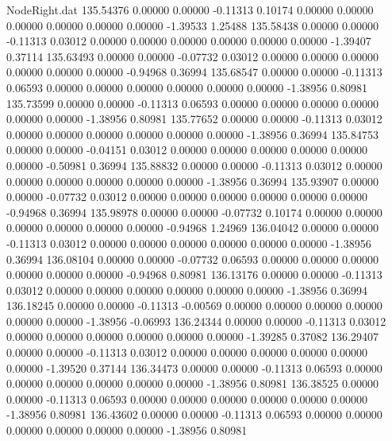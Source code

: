 \begin{filecontents}{NodeRight.dat}
 135.54376    0.00000    0.00000    -0.11313    0.10174    0.00000    0.00000    0.00000    0.00000    0.00000    0.00000   -1.39533    1.25488
 135.58438    0.00000    0.00000    -0.11313    0.03012    0.00000    0.00000    0.00000    0.00000    0.00000    0.00000   -1.39407    0.37114
 135.63493    0.00000    0.00000    -0.07732    0.03012    0.00000    0.00000    0.00000    0.00000    0.00000    0.00000   -0.94968    0.36994
 135.68547    0.00000    0.00000    -0.11313    0.06593    0.00000    0.00000    0.00000    0.00000    0.00000    0.00000   -1.38956    0.80981
 135.73599    0.00000    0.00000    -0.11313    0.06593    0.00000    0.00000    0.00000    0.00000    0.00000    0.00000   -1.38956    0.80981
 135.77652    0.00000    0.00000    -0.11313    0.03012    0.00000    0.00000    0.00000    0.00000    0.00000    0.00000   -1.38956    0.36994
 135.84753    0.00000    0.00000    -0.04151    0.03012    0.00000    0.00000    0.00000    0.00000    0.00000    0.00000   -0.50981    0.36994
 135.88832    0.00000    0.00000    -0.11313    0.03012    0.00000    0.00000    0.00000    0.00000    0.00000    0.00000   -1.38956    0.36994
 135.93907    0.00000    0.00000    -0.07732    0.03012    0.00000    0.00000    0.00000    0.00000    0.00000    0.00000   -0.94968    0.36994
 135.98978    0.00000    0.00000    -0.07732    0.10174    0.00000    0.00000    0.00000    0.00000    0.00000    0.00000   -0.94968    1.24969
 136.04042    0.00000    0.00000    -0.11313    0.03012    0.00000    0.00000    0.00000    0.00000    0.00000    0.00000   -1.38956    0.36994
 136.08104    0.00000    0.00000    -0.07732    0.06593    0.00000    0.00000    0.00000    0.00000    0.00000    0.00000   -0.94968    0.80981
 136.13176    0.00000    0.00000    -0.11313    0.03012    0.00000    0.00000    0.00000    0.00000    0.00000    0.00000   -1.38956    0.36994
 136.18245    0.00000    0.00000    -0.11313   -0.00569    0.00000    0.00000    0.00000    0.00000    0.00000    0.00000   -1.38956   -0.06993
 136.24344    0.00000    0.00000    -0.11313    0.03012    0.00000    0.00000    0.00000    0.00000    0.00000    0.00000   -1.39285    0.37082
 136.29407    0.00000    0.00000    -0.11313    0.03012    0.00000    0.00000    0.00000    0.00000    0.00000    0.00000   -1.39520    0.37144
 136.34473    0.00000    0.00000    -0.11313    0.06593    0.00000    0.00000    0.00000    0.00000    0.00000    0.00000   -1.38956    0.80981
 136.38525    0.00000    0.00000    -0.11313    0.06593    0.00000    0.00000    0.00000    0.00000    0.00000    0.00000   -1.38956    0.80981
 136.43602    0.00000    0.00000    -0.11313    0.06593    0.00000    0.00000    0.00000    0.00000    0.00000    0.00000   -1.38956    0.80981

\end{filecontents}
